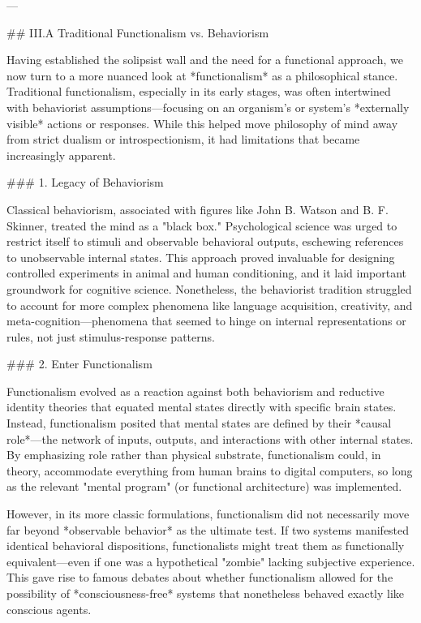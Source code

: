 ---

## III.A Traditional Functionalism vs. Behaviorism

Having established the solipsist wall and the need for a functional approach, we now turn to a more nuanced look at *functionalism* as a philosophical stance. Traditional functionalism, especially in its early stages, was often intertwined with behaviorist assumptions—focusing on an organism's or system's *externally visible* actions or responses. While this helped move philosophy of mind away from strict dualism or introspectionism, it had limitations that became increasingly apparent.

### 1. Legacy of Behaviorism

Classical behaviorism, associated with figures like John B. Watson and B. F. Skinner, treated the mind as a "black box." Psychological science was urged to restrict itself to stimuli and observable behavioral outputs, eschewing references to unobservable internal states. This approach proved invaluable for designing controlled experiments in animal and human conditioning, and it laid important groundwork for cognitive science. Nonetheless, the behaviorist tradition struggled to account for more complex phenomena like language acquisition, creativity, and meta-cognition—phenomena that seemed to hinge on internal representations or rules, not just stimulus-response patterns.

### 2. Enter Functionalism

Functionalism evolved as a reaction against both behaviorism and reductive identity theories that equated mental states directly with specific brain states. Instead, functionalism posited that mental states are defined by their *causal role*—the network of inputs, outputs, and interactions with other internal states. By emphasizing role rather than physical substrate, functionalism could, in theory, accommodate everything from human brains to digital computers, so long as the relevant "mental program" (or functional architecture) was implemented.

However, in its more classic formulations, functionalism did not necessarily move far beyond *observable behavior* as the ultimate test. If two systems manifested identical behavioral dispositions, functionalists might treat them as functionally equivalent—even if one was a hypothetical "zombie" lacking subjective experience. This gave rise to famous debates about whether functionalism allowed for the possibility of *consciousness-free* systems that nonetheless behaved exactly like conscious agents.

